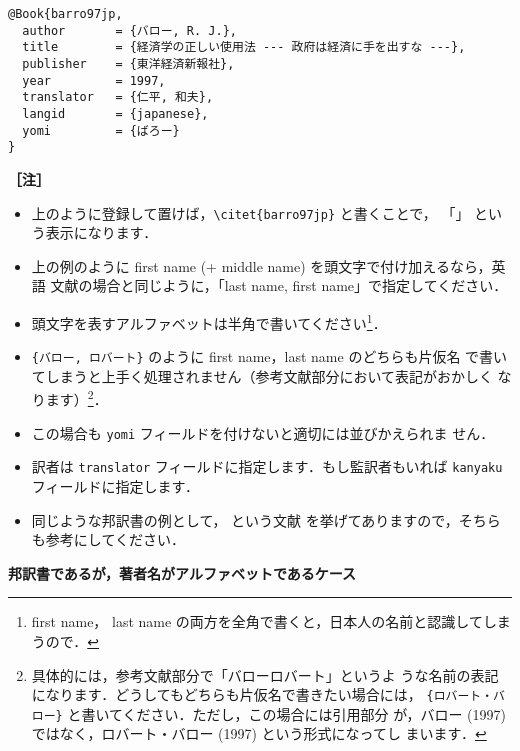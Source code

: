 \documentclass[article]{jlreq}
\newcommand{\midashii}[1]{\noindent \textbf{［#1］}}
\begin{document}
\begin{screen}
\begin{verbatim}
@Book{barro97jp,
  author       = {バロー, R. J.},
  title        = {経済学の正しい使用法 --- 政府は経済に手を出すな ---},
  publisher    = {東洋経済新報社},
  year         = 1997,
  translator   = {仁平, 和夫},
  langid       = {japanese},
  yomi         = {ばろー}
}
\end{verbatim}
\end{screen}
\vspace*{1em}

\midashii{注} 
\begin{itemize}
 \item 上のように登録して置けば，\verb|\citet{barro97jp}| と書くことで，
       「\citet{barro97jp}」 という表示になります．
 \item 上の例のように first name (+ middle name) を頭文字で付け加えるなら，英語
       文献の場合と同じように，「last name, first name」で指定してください．
 \item 頭文字を表すアルファベットは半角で書いてください\footnote{first name，
       last name の両方を全角で書くと，日本人の名前と認識してしまうので．}．
 \item \verb|{バロー, ロバート}| のように first name，last name のどちらも片仮名
       で書いてしまうと上手く処理されません（参考文献部分において表記がおかしく
       なります）\footnote{具体的には，参考文献部分で「バローロバート」というよ
       うな名前の表記になります．どうしてもどちらも片仮名で書きたい場合には，
       \texttt{\{ロバート・バロー\}} と書いてください．ただし，この場合には引用部分
       が，バロー (1997) ではなく，ロバート・バロー (1997) という形式になってし
       まいます．}．
 \item この場合も \texttt{yomi} フィールドを付けないと適切には並びかえられま
       せん．
 \item 訳者は \texttt{translator} フィールドに指定します．もし監訳者もいれば
       \texttt{kanyaku} フィールドに指定します．
 \item 同じような邦訳書の例として，\cite{markusen99jp:trade_vol_1} という文献
       を挙げてありますので，そちらも参考にしてください．
\end{itemize}

\vspace*{1em}

\noindent \textbf{邦訳書であるが，著者名がアルファベットであるケース}
\end{document}
